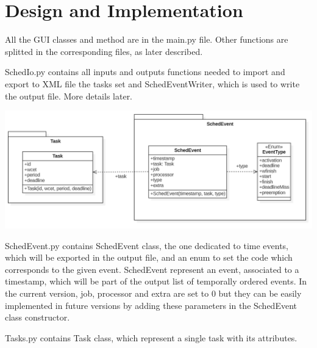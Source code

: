\section{Design and Implementation}

All the GUI classes and method are in the main.py file. Other functions are splitted in the corresponding files, as later described.
\par SchedIo.py contains all inputs and outputs functions needed to import and export to XML file the tasks set and SchedEventWriter, which is used to write the output file. More details later.

\begin{center}
\includegraphics[width=1\textwidth]{SchedEventClass.png}
\end{center}
SchedEvent.py contains SchedEvent class, the one dedicated to time events, which will be exported in the output file, and an enum to set the code which corresponds to the given event. SchedEvent represent an event, associated to a timestamp, which will be part of the output list of temporally ordered events. In the current version, job, processor and extra are set to 0 but they can be easily implemented in future versions by adding these parameters in the SchedEvent class constructor.
\par Tasks.py contains Task class, which represent a single task with its attributes.

